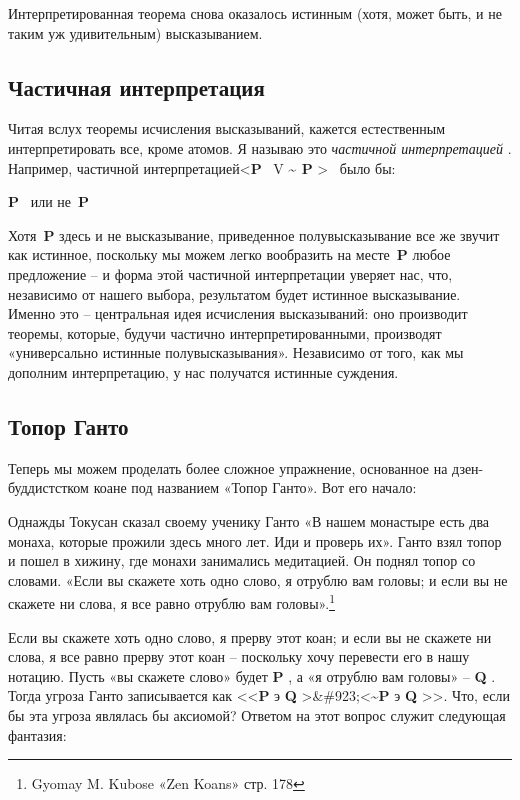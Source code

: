 \documentclass[../main.tex]{subfiles}
\begin{document}
Интерпретированная теорема снова оказалось истинным (хотя, может быть, и не таким уж удивительным) высказыванием.


\subsection{Частичная интерпретация}

Читая вслух теоремы исчисления высказываний, кажется естественным интерпретировать все, кроме атомов. Я называю это \emph{частичной интерпретацией} . Например, частичной интерпретацией\textless{}\textbf{P} ~V \textbf{\textasciitilde{} P} \textgreater~ было бы:

\textbf{P} ~или не~\textbf{P}

Хотя~\textbf{P} здесь и не высказывание, приведенное полувысказывание все же звучит как истинное, поскольку мы можем легко вообразить на месте~\textbf{P} любое предложение \--- и форма этой частичной интерпретации уверяет нас, что, независимо от нашего выбора, результатом будет истинное высказывание. Именно это \--- центральная идея исчисления высказываний: оно производит теоремы, которые, будучи частично интерпретированными, производят «универсально истинные полувысказывания». Независимо от того, как мы дополним интерпретацию, у нас получатся истинные суждения.


\subsection{Топор Ганто}

Теперь мы можем проделать более сложное упражнение, основанное на дзен-буддистстком коане под названием «Топор Ганто». Вот его начало:

Однажды Токусан сказал своему ученику Ганто «В нашем монастыре есть два монаха, которые прожили здесь много лет. Иди и проверь их». Ганто взял топор и пошел в хижину, где монахи занимались медитацией. Он поднял топор со словами. «Если вы скажете хоть одно слово, я отрублю вам головы; и если вы не скажете ни слова, я все равно отрублю вам головы».\footnote{Gyomay M. Kubose «Zen Koans» стр. 178}

Если вы скажете хоть одно слово, я прерву этот коан; и если вы не скажете ни слова, я все равно прерву этот коан \--- поскольку хочу перевести его в нашу нотацию. Пусть «вы скажете слово» будет \textbf{P} , а «я отрублю вам головы» \--- \textbf{Q} . Тогда угроза Ганто записывается как \textless\textless{}\textbf{P} э \textbf{Q} \textgreater\&\#923;\textless{}\textbf{\textasciitilde P} э \textbf{Q} \textgreater\textgreater. Что, если бы эта угроза являлась бы аксиомой? Ответом на этот вопрос служит следующая фантазия:
\end{document}
